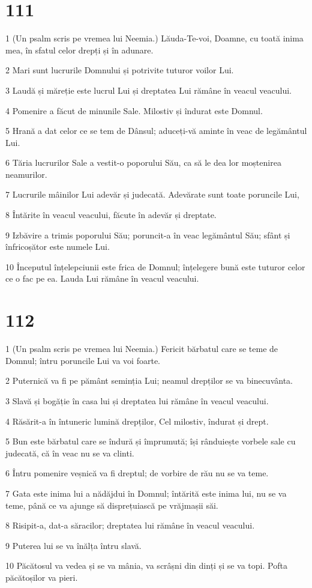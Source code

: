 \chapter{111}

\par 1 (Un psalm scris pe vremea lui Neemia.) Lăuda-Te-voi, Doamne, cu toată inima mea, în sfatul celor drepți și în adunare.
\par 2 Mari sunt lucrurile Domnului și potrivite tuturor voilor Lui.
\par 3 Laudă și măreție este lucrul Lui și dreptatea Lui rămâne în veacul veacului.
\par 4 Pomenire a făcut de minunile Sale. Milostiv și îndurat este Domnul.
\par 5 Hrană a dat celor ce se tem de Dânsul; aduceți-vă aminte în veac de legământul Lui.
\par 6 Tăria lucrurilor Sale a vestit-o poporului Său, ca să le dea lor moștenirea neamurilor.
\par 7 Lucrurile mâinilor Lui adevăr și judecată. Adevărate sunt toate poruncile Lui,
\par 8 Întărite în veacul veacului, făcute în adevăr și dreptate.
\par 9 Izbăvire a trimis poporului Său; poruncit-a în veac legământul Său; sfânt și înfricoșător este numele Lui.
\par 10 Începutul înțelepciunii este frica de Domnul; înțelegere bună este tuturor celor ce o fac pe ea. Lauda Lui rămâne în veacul veacului.

\chapter{112}

\par 1 (Un psalm scris pe vremea lui Neemia.) Fericit bărbatul care se teme de Domnul; întru poruncile Lui va voi foarte.
\par 2 Puternică va fi pe pământ seminția Lui; neamul drepților se va binecuvânta.
\par 3 Slavă și bogăție în casa lui și dreptatea lui rămâne în veacul veacului.
\par 4 Răsărit-a în întuneric lumină drepților, Cel milostiv, îndurat și drept.
\par 5 Bun este bărbatul care se îndură și împrumută; își rânduiește vorbele sale cu judecată, că în veac nu se va clinti.
\par 6 Întru pomenire veșnică va fi dreptul; de vorbire de rău nu se va teme.
\par 7 Gata este inima lui a nădăjdui în Domnul; întărită este inima lui, nu se va teme, până ce va ajunge să disprețuiască pe vrăjmașii săi.
\par 8 Risipit-a, dat-a săracilor; dreptatea lui rămâne în veacul veacului.
\par 9 Puterea lui se va înălța întru slavă.
\par 10 Păcătosul va vedea și se va mânia, va scrâșni din dinți și se va topi. Pofta păcătoșilor va pieri.

